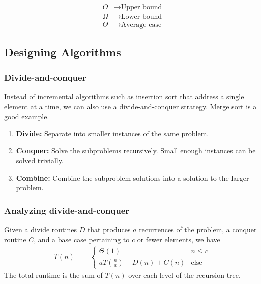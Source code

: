 \documentclass[12pt]{article}
\newcommand{\round}[1]{\left(  #1 \right)}
\begin{document}
\begin{align*}
    O      &\rightarrow \text{Upper bound} \\
    \Omega &\rightarrow \text{Lower bound} \\
    \Theta &\rightarrow \text{Average case}
\end{align*}

\subsection{Designing Algorithms}

\subsubsection{Divide-and-conquer}
Instead of incremental algorithms such as insertion sort that address a single element at a time, we can also use a divide-and-conquer strategy. Merge sort is a good example.
\begin{enumerate}
    \item \textbf{Divide:} Separate into smaller instances of the same problem.
    \item \textbf{Conquer:} Solve the subproblems recursively. Small enough instances can be solved trivially.
    \item \textbf{Combine:} Combine the subproblem solutions into a solution to the larger problem.
\end{enumerate}

\subsubsection{Analyzing divide-and-conquer}
Given a divide routines $D$ that produces $a$ recurrences of the problem, a conquer routine $C$, and a base case pertaining to $c$ or fewer elements, we have
\begin{align*}
    T(n) &= \begin{cases}
        \Theta(1) & n \leq c \\
        aT\round{\frac{n}{a}} + D(n) + C(n) & \text{else}
    \end{cases}
\end{align*}
The total runtime is the sum of $T(n)$ over each level of the recursion tree.
\end{document}
